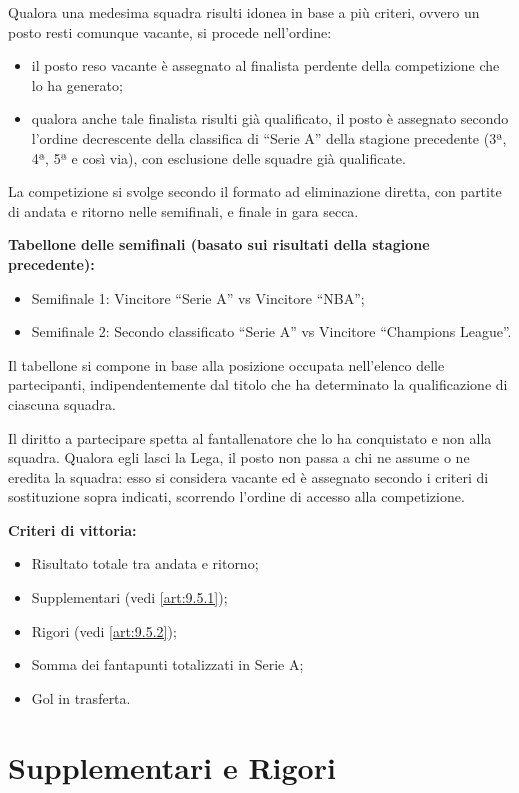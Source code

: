 Qualora una medesima squadra risulti idonea in base a più criteri, ovvero un posto resti comunque vacante, si procede nell'ordine:

\begin{itemize}
    \item il posto reso vacante è assegnato al finalista perdente della competizione che lo ha generato;
    \item qualora anche tale finalista risulti già qualificato, il posto è assegnato secondo l'ordine decrescente della classifica di “Serie A” della stagione precedente (3ª, 4ª, 5ª e così via), con esclusione delle squadre già qualificate.
\end{itemize}

La competizione si svolge secondo il formato ad eliminazione diretta, con partite di andata e ritorno nelle semifinali, e finale in gara secca.

\textbf{Tabellone delle semifinali (basato sui risultati della stagione precedente):}
\begin{itemize}
    \item Semifinale 1: Vincitore “Serie A” vs Vincitore “NBA”;
    \item Semifinale 2: Secondo classificato “Serie A” vs Vincitore “Champions League”.
\end{itemize}

Il tabellone si compone in base alla posizione occupata nell'elenco delle partecipanti, indipendentemente dal titolo che ha determinato la qualificazione di ciascuna squadra.

Il diritto a partecipare spetta al fantallenatore che lo ha conquistato e non alla squadra. Qualora egli lasci la Lega, il posto non passa a chi ne assume o ne eredita la squadra: esso si considera vacante ed è assegnato secondo i criteri di sostituzione sopra indicati, scorrendo l'ordine di accesso alla competizione.

\textbf{Criteri di vittoria:}
\begin{itemize}
\item Risultato totale tra andata e ritorno;
\item Supplementari (vedi \ref{art:9.5.1});
\item Rigori (vedi \ref{art:9.5.2});
\item Somma dei fantapunti totalizzati in Serie A;
\item Gol in trasferta.
\end{itemize}

\section{Supplementari e Rigori}
\label{art:9.5}

